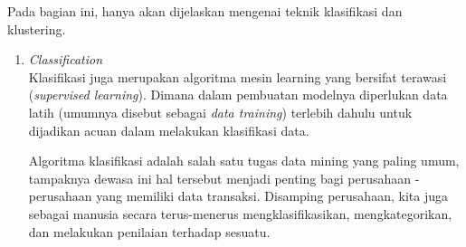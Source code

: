 Pada bagian ini, hanya akan dijelaskan mengenai teknik klasifikasi dan klustering.

\begin{enumerate}
	\item{\textit{Classification}\cite{book:339389}}\\
	Klasifikasi juga merupakan algoritma mesin learning yang bersifat terawasi (\textit{supervised learning}). Dimana dalam pembuatan modelnya diperlukan data latih (umumnya disebut sebagai \textit{data training}) terlebih dahulu untuk dijadikan acuan dalam melakukan klasifikasi data.
	
	Algoritma klasifikasi adalah salah satu tugas data mining yang paling umum, tampaknya dewasa ini hal tersebut menjadi penting bagi perusahaan - perusahaan yang memiliki data transaksi. Disamping perusahaan, kita juga sebagai manusia secara terus-menerus mengklasifikasikan, mengkategorikan, dan melakukan penilaian terhadap sesuatu. 
	

\end{enumerate}
